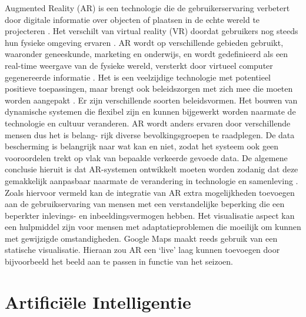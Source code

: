 Augmented Reality (AR) is een technologie die de gebruikerservaring verbetert door digitale informatie over objecten of plaatsen in de echte wereld te projecteren \autocite{Berryman2012}. Het verschilt van virtual reality (VR) doordat gebruikers nog steeds hun fysieke omgeving ervaren \autocite{Calo2015}. AR wordt op verschillende gebieden gebruikt, waaronder geneeskunde, marketing en onderwijs, en wordt gedefinieerd als een real-time weergave van de fysieke wereld, versterkt door virtueel computer gegenereerde informatie \autocite{Carmigniani2011}. Het is een veelzijdige technologie met potentieel positieve toepassingen, maar brengt ook beleidszorgen met zich mee die moeten worden aangepakt \autocite{Calo2015}. Er zijn verschillende soorten beleidsvormen. Het bouwen van dynamische systemen die flexibel zijn en kunnen bijgewerkt worden naarmate de technologie en cultuur veranderen. AR wordt anders ervaren door verschillende mensen dus het is belang- rijk diverse bevolkingsgroepen te raadplegen. De data bescherming is belangrijk naar wat kan en niet, zodat het systeem ook geen vooroordelen trekt op vlak van bepaalde verkeerde gevoede data. De algemene conclusie hieruit is dat AR-systemen ontwikkelt moeten worden zodanig dat deze gemakkelijk aanpasbaar naarmate de verandering in technologie en samenleving \autocite{Calo2015}. Zoals hiervoor vermeld kan de integratie van AR extra mogelijkheden toevoegen aan de gebruikservaring van mensen met een verstandelijke beperking die een beperkter inlevings- en inbeeldingsvermogen hebben. Het visualisatie aspect kan een hulpmiddel zijn voor mensen met adaptatieproblemen die moeilijk om kunnen met gewijzigde omstandigheden. Google Maps maakt reeds gebruik van een statische visualisatie. Hieraan zou AR een ‘live’ laag kunnen toevoegen door bijvoorbeeld het beeld aan te passen in functie van het seizoen.



\section{Artificiële Intelligentie}
\label{sec:artificiele-intelligentie}

